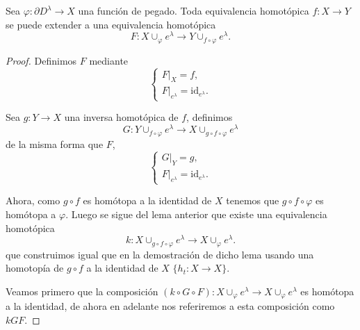 \begin{lemma}
\label{lema2_democwvariedad}
    Sea $\varphi: \partial D^{\lambda} \to X$ una función de pegado. Toda equivalencia homotópica $f:X\to Y$ se puede extender a una equivalencia homotópica 
    \begin{equation*}
        F: X\cup_{\varphi} e^{\lambda} \to Y\cup_{f\circ\varphi} e^{\lambda}.
    \end{equation*}
\end{lemma}
\begin{proof}
    Definimos $F$ mediante
    \begin{equation*}
        \begin{cases}
            F|_X = f, \\
            F|_{e^{\lambda}} = \text{id}_{e^{\lambda}}.
        \end{cases}
    \end{equation*}

    Sea $g:Y\to X$ una inversa homotópica de $f$, definimos
    \begin{equation*}
        G: Y\cup_{f\circ\varphi} e^{\lambda} \to X\cup_{g\circ f\circ\varphi} e^{\lambda}
    \end{equation*}
    de la misma forma que $F$,
    \begin{equation*}
        \begin{cases}
            G|_Y = g, \\
            F|_{e^{\lambda}} = \text{id}_{e^{\lambda}}.
        \end{cases}
    \end{equation*}

    Ahora, como $g\circ f$ es homótopa a la identidad de $X$ tenemos que $g\circ f\circ\varphi$ es homótopa a $\varphi$. Luego se sigue del lema anterior que existe una equivalencia homotópica 
    \begin{equation*}
        k: X\cup_{g\circ f\circ\varphi} e^{\lambda} \to X\cup_{\varphi} e^{\lambda}.
    \end{equation*}
    que construimos igual que en la demostración de dicho lema usando una homotopía de $g\circ f$ a la identidad de $X$ $\{h_t: X \to X\}$.

    Veamos primero que la composición $(k\circ G\circ F):X\cup_{\varphi} e^{\lambda}\to X\cup_{\varphi} e^{\lambda}$ es homótopa a la identidad, de ahora en adelante nos referiremos a esta composición como $kGF$. 
    

\end{proof}
